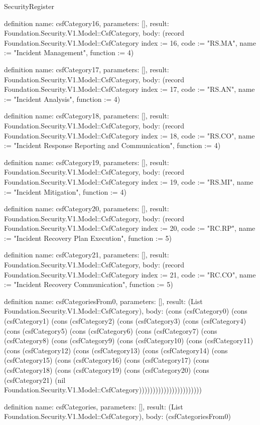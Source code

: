 \begin{lexlean}{SecurityRegister}
\begin{semanticmodule}
definition{
  name: csfCategory16,
  parameters: [],
  result: Foundation.Security.V1.Model::CsfCategory,
  body: (record Foundation.Security.V1.Model::CsfCategory {index := 16, code := "RS.MA", name := "Incident Management", function := 4})
}

definition{
  name: csfCategory17,
  parameters: [],
  result: Foundation.Security.V1.Model::CsfCategory,
  body: (record Foundation.Security.V1.Model::CsfCategory {index := 17, code := "RS.AN", name := "Incident Analysis", function := 4})
}

definition{
  name: csfCategory18,
  parameters: [],
  result: Foundation.Security.V1.Model::CsfCategory,
  body: (record Foundation.Security.V1.Model::CsfCategory {index := 18, code := "RS.CO", name := "Incident Response Reporting and Communication", function := 4})
}

definition{
  name: csfCategory19,
  parameters: [],
  result: Foundation.Security.V1.Model::CsfCategory,
  body: (record Foundation.Security.V1.Model::CsfCategory {index := 19, code := "RS.MI", name := "Incident Mitigation", function := 4})
}

definition{
  name: csfCategory20,
  parameters: [],
  result: Foundation.Security.V1.Model::CsfCategory,
  body: (record Foundation.Security.V1.Model::CsfCategory {index := 20, code := "RC.RP", name := "Incident Recovery Plan Execution", function := 5})
}

definition{
  name: csfCategory21,
  parameters: [],
  result: Foundation.Security.V1.Model::CsfCategory,
  body: (record Foundation.Security.V1.Model::CsfCategory {index := 21, code := "RC.CO", name := "Incident Recovery Communication", function := 5})
}

definition{
  name: csfCategoriesFrom0,
  parameters: [],
  result: (List Foundation.Security.V1.Model::CsfCategory),
  body: (cons (csfCategory0) (cons (csfCategory1) (cons (csfCategory2) (cons (csfCategory3) (cons (csfCategory4) (cons (csfCategory5) (cons (csfCategory6) (cons (csfCategory7) (cons (csfCategory8) (cons (csfCategory9) (cons (csfCategory10) (cons (csfCategory11) (cons (csfCategory12) (cons (csfCategory13) (cons (csfCategory14) (cons (csfCategory15) (cons (csfCategory16) (cons (csfCategory17) (cons (csfCategory18) (cons (csfCategory19) (cons (csfCategory20) (cons (csfCategory21) (nil Foundation.Security.V1.Model::CsfCategory)))))))))))))))))))))))
}

definition{
  name: csfCategories,
  parameters: [],
  result: (List Foundation.Security.V1.Model::CsfCategory),
  body: (csfCategoriesFrom0)
}


\end{semanticmodule}
\end{lexlean}
